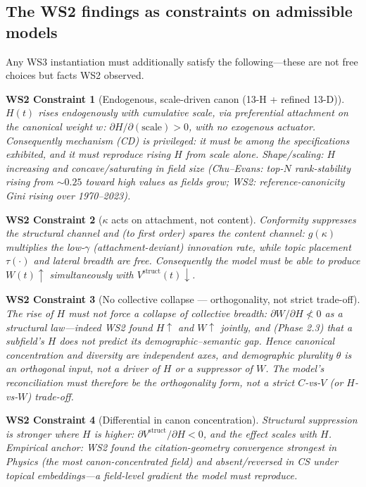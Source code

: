 \documentclass[11pt,letterpaper]{article}
\theoremstyle{definition}
\theoremstyle{plain}
\newtheorem{wsc}{WS2 Constraint}
\begin{document}
\subsection{The WS2 findings as constraints on admissible models}

Any WS3 instantiation must additionally satisfy the following---these are not
free choices but facts WS2 observed.

\begin{wsc}[Endogenous, scale-driven canon (13-H + refined 13-D)]\label{wsc:H}
$H(t)$ rises \emph{endogenously} with cumulative scale, via preferential
attachment on the canonical weight $w$: $\partial H/\partial(\text{scale}) > 0$,
with no exogenous actuator. Consequently mechanism (CD) is \emph{privileged}: it
must be among the specifications exhibited, and it must reproduce rising $H$ from
scale alone. \emph{Shape/scaling:} $H$ increasing and concave/saturating in field
size (Chu--Evans: top-$N$ rank-stability rising from $\sim\!0.25$ toward high
values as fields grow; WS2: reference-canonicity Gini rising over 1970--2023).
\end{wsc}

\begin{wsc}[$\kappa$ acts on attachment, not content]\label{wsc:channel}
Conformity suppresses the structural channel and (to first order) spares the
content channel: $g(\kappa)$ multiplies the low-$\gamma$ (attachment-deviant)
innovation rate, while topic placement $\tau(\cdot)$ and lateral breadth are
free. Consequently the model must be able to produce $W(t)\uparrow$
\emph{simultaneously} with $V^{\mathrm{struct}}(t)\downarrow$.
\end{wsc}

\begin{wsc}[No collective collapse --- orthogonality, not strict trade-off]\label{wsc:indep}
The rise of $H$ must \emph{not} force a collapse of collective breadth:
$\partial W/\partial H \not< 0$ as a structural law---indeed WS2 found $H\uparrow$
and $W\uparrow$ jointly, and (Phase 2.3) that a subfield's $H$ does \emph{not}
predict its demographic--semantic gap. Hence canonical concentration and diversity
are \emph{independent axes}, and demographic plurality $\theta$ is an
\emph{orthogonal input}, not a driver of $H$ or a suppressor of $W$. The model's
reconciliation must therefore be the \emph{orthogonality} form, not a strict
$C$-vs-$V$ (or $H$-vs-$W$) trade-off.
\end{wsc}

\begin{wsc}[Differential in canon concentration]\label{wsc:diff}
Structural suppression is \emph{stronger where $H$ is higher}: $\partial
V^{\mathrm{struct}}/\partial H < 0$, and the effect scales with $H$. Empirical
anchor: WS2 found the citation-geometry convergence strongest in Physics (the
most canon-concentrated field) and absent/reversed in CS under topical
embeddings---a field-level gradient the model must reproduce.
\end{wsc}
\end{document}
